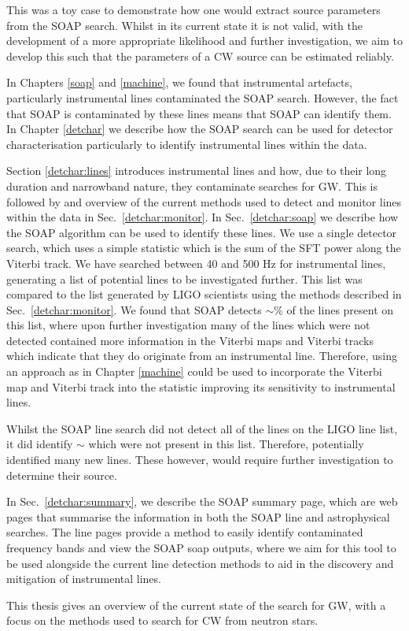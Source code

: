 This was a toy case to demonstrate how one would extract source parameters from the SOAP search.
Whilst in its current state it is not valid, with the development of a more appropriate likelihood and further investigation, we aim to develop this such that the parameters of a \gls{CW} source can be estimated reliably. 

\bigskip

In Chapters \ref{soap} and \ref{machine}, we found that instrumental artefacts, particularly instrumental lines contaminated the SOAP search.
However, the fact that SOAP is contaminated by these lines means that SOAP can identify them.
In Chapter \ref{detchar} we describe how the SOAP search can be used for detector characterisation particularly to identify instrumental lines within the data.

Section \ref{detchar:lines} introduces instrumental lines and how, due to their long duration and narrowband nature, they contaminate searches for \gls{GW}. 
This is followed by and overview of the current methods used to detect and monitor lines within the data in Sec.~\ref{detchar:monitor}.
In Sec.~\ref{detchar:soap} we describe how the SOAP algorithm can be used to identify these lines.
We use a single detector search, which uses a simple statistic which is the sum of the \gls{SFT} power along the Viterbi track. 
We have searched between 40 and 500 Hz for instrumental lines, generating a list of potential lines to be investigated further.
This list was compared to the list generated by \gls{LIGO} scientists using the methods described in Sec.~\ref{detchar:monitor}.
We found that SOAP detects $\sim $\% of the lines present on this list, where upon further investigation many of the lines which were not detected contained more information in the Viterbi maps and Viterbi tracks which indicate that they do originate from an instrumental line.
Therefore, using an approach as in Chapter \ref{machine} could be used to incorporate the Viterbi map and Viterbi track into the statistic improving its sensitivity to instrumental lines.

Whilst the SOAP line search did not detect all of the lines on the \gls{LIGO} line list, it did identify $\sim $ which were not present in this list.
Therefore, potentially identified many new lines.
These however, would require further investigation to determine their source.

In Sec.~\ref{detchar:summary}, we describe the SOAP summary page, which are web pages that summarise the information in both the SOAP line and astrophysical searches.
The line pages provide a method to easily identify contaminated frequency bands and view the SOAP soap outputs, where we aim for this tool to be used alongside the current line detection methods to aid in the discovery and mitigation of instrumental lines.

\bigskip

This thesis gives an overview of the current state of the search for \gls{GW}, with a focus on the methods used to search for \gls{CW} from neutron stars.









